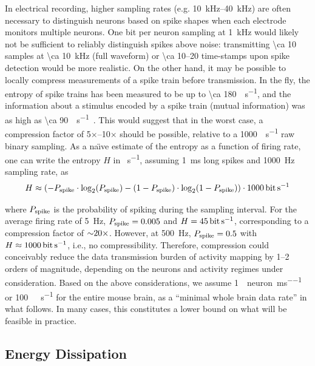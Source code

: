 In electrical recording, higher sampling rates (e.g. \SIrange{10}{40}{\kilo\hertz}) are often necessary to distinguish neurons based on spike shapes when each electrode monitors multiple neurons.
One bit per neuron sampling at \SI{1}{\kilo\hertz} would likely not be sufficient to reliably distinguish spikes above noise: transmitting \SI{\ca 10}{\bit} samples at \SI{\ca 10}{\kilo\hertz} (full waveform) or \SIrange{\ca 10}{20}{\bit} time-stamps upon spike detection would be more realistic.
On the other hand, it may be possible to locally compress measurements of a spike train before transmission.
In the fly, the entropy of spike trains has been measured to be up to \SI{\ca 180}{\bit\per\second}, and the information about a stimulus encoded by a spike train (mutual information) was as high as \SI{\ca 90}{\bit\per\second}~\cite{strong98}. This would suggest that in the worst case, a compression factor of 5$\times$--10$\times$ should be possible, relative to a \SI{1000}{\bit\per\second} raw binary sampling. As a na\"{\i}ve estimate of the entropy as a function of firing rate, one can write the entropy $H$ in \si{\bit\per\second}, assuming \SI{1}{\milli\second} long spikes and \SI{1000}{\hertz} sampling rate, as
\[H \approx \left(-P\sub{spike}\cdot\log_2\!\left(P\sub{spike}\right) - \left(1 - P\sub{spike}\right)\cdot\log_2\!\left(1 - P\sub{spike}\right)\right) \cdot \SI{1000}{\bit\per\second}\]

where $P_{\text{\scriptsize spike}}$ is the probability of spiking during the sampling interval.
For the average firing rate of \SI{5}{\hertz}, $P_{\text{\scriptsize spike}}=0.005$ and $H=\SI{45}{\bit\per\second}$, corresponding to a compression factor of ${\sim} 20\times$.
However, at \SI{500}{\hertz}, $P_{\text{\scriptsize spike}}=0.5$ with $H\approx\SI{1000}{\bit\per\second}$, i.e., no compressibility. 
Therefore, compression could conceivably reduce the data transmission burden of activity mapping by 1--2 orders of magnitude, depending on the neurons and activity regimes under consideration.
Based on the above considerations, we assume \SI{1}{\bit\per neuron\per\milli\second} or \SI{100}{\giga\bit\per\second} for the entire mouse brain, as a ``minimal whole brain data rate'' in what follows.
In many cases, this constitutes a lower bound on what will be feasible in practice.

\subsection{Energy Dissipation}

